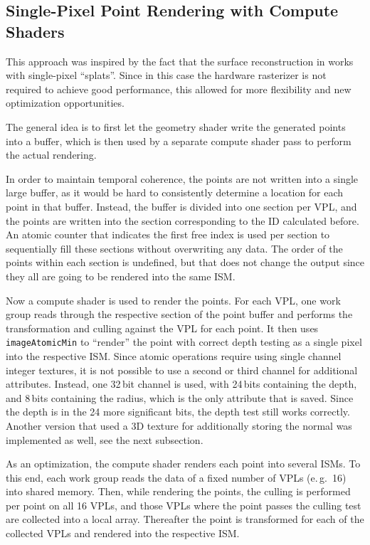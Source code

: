 \subsection{Single-Pixel Point Rendering with Compute Shaders}
\label{sec:impl:singlePixelRendering}

This approach was inspired by the fact that the surface reconstruction in \citet{Marroquim:2007:reconstruction} works with single-pixel ``splats''. Since in this case the hardware rasterizer is not required to achieve good performance, this allowed for more flexibility and new optimization opportunities.

The general idea is to first let the geometry shader write the generated points into a buffer, which is then used by a separate compute shader pass to perform the actual rendering.

In order to maintain temporal coherence, the points are not written into a single large buffer, as it would be hard to consistently determine a location for each point in that buffer. Instead, the buffer is divided into one section per VPL, and the points are written into the section corresponding to the ID calculated before. An atomic counter that indicates the first free index is used per section to sequentially fill these sections without overwriting any data. The order of the points within each section is undefined, but that does not change the output since they all are going to be rendered into the same ISM.

Now a compute shader is used to render the points. For each VPL, one work group reads through the respective section of the point buffer and performs the transformation and culling against the VPL for each point. It then uses \texttt{imageAtomicMin} to ``render'' the point with correct depth testing as a single pixel into the respective ISM. Since atomic operations require using single channel integer textures, it is not possible to use a second or third channel for additional attributes. Instead, one 32\,bit channel is used, with 24\,bits containing the depth, and 8\,bits containing the radius, which is the only attribute that is saved. Since the depth is in the 24 more significant bits, the depth test still works correctly. Another version that used a 3D texture for additionally storing the normal was implemented as well, see the next subsection.

As an optimization, the compute shader renders each point into several ISMs. To this end, each work group reads the data of a fixed number of VPLs (e.\,g.\ 16) into shared memory. Then, while rendering the points, the culling is performed per point on all 16 VPLs, and those VPLs where the point passes the culling test are collected into a local array. Thereafter the point is transformed for each of the collected VPLs and rendered into the respective ISM.

